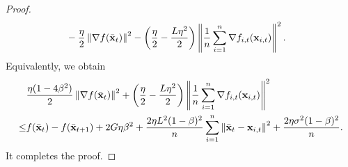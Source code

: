 \documentclass{article}
\begin{document}
\begin{proof}
\begin{align}
& - \frac{\eta}{2}\left\lVert\nabla f(\bar{{\bf x}}_t)\right\rVert^2 - \left( \frac{\eta}{2} - \frac{L\eta^2}{2} \right)\left\lVert\frac{1}{n}\sum_{i=1}^n \nabla f_{i,t}({\bf x}_{i,t})\right\rVert^2.
\end{align} Equivalently, we obtain
\begin{align}
\nonumber
& \frac{\eta(1-4\beta^2)}{2}\left\lVert\nabla f(\bar{{\bf x}}_t)\right\rVert^2 + \left( \frac{\eta}{2} - \frac{L\eta^2}{2} \right)\left\lVert\frac{1}{n}\sum_{i=1}^n \nabla f_{i,t}({\bf x}_{i,t})\right\rVert^2 \\ \nonumber 
\le & f(\bar{{\bf x}}_t) - f(\bar{{\bf x}}_{t+1}) + 2G\eta\beta^2 +  \frac{2\eta L^2(1-\beta)^2}{n}\sum_{i=1}^n\left\lVert\bar{{\bf x}}_t - {\bf x}_{i,t} \right\rVert^2 + \frac{2\eta\sigma^2(1-\beta)^2}{n}.
\end{align} It completes the proof.



\end{proof}
\end{document}
